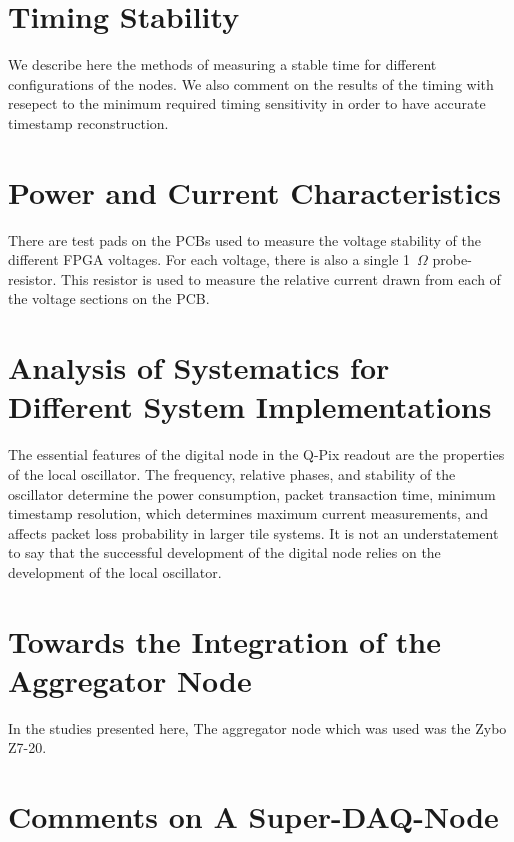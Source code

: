 



\section{Timing Stability}

We describe here the methods of measuring a stable time for different configurations of the nodes.
We also comment on the results of the timing with resepect to the minimum required timing sensitivity in order to have accurate timestamp reconstruction.

\section{Power and Current Characteristics}

There are test pads on the PCBs used to measure the voltage stability of the different FPGA voltages.
For each voltage, there is also a single 1~$\unit{\Omega}$ probe-resistor.
This resistor is used to measure the relative current drawn from each of the voltage sections on the PCB.

\section{Analysis of Systematics for Different System Implementations}

The essential features of the digital node in the Q-Pix readout are the properties of the local oscillator.
The frequency, relative phases, and stability of the oscillator determine the power consumption, packet transaction time, minimum timestamp resolution, which determines maximum current measurements, and affects packet loss probability in larger tile systems.
It is not an understatement to say that the successful development of the digital node relies on the development of the local oscillator.

\section{Towards the Integration of the Aggregator Node}

In the studies presented here, The aggregator node which was used was the Zybo Z7-20.


\section{Comments on A Super-DAQ-Node}

